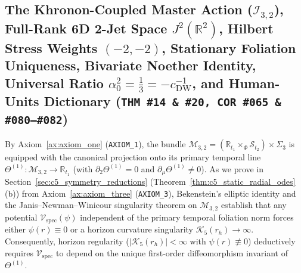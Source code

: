 \documentclass[11pt,a4paper]{article}
\theoremstyle{definition}
\theoremstyle{plain}
\theoremstyle{remark}
\begin{document}
\subsection{The Khronon-Coupled Master Action ($\mathcal{I}_{3,2}$), Full-Rank 6D 2-Jet Space $J^2(\mathbb{R}^2)$, Hilbert Stress Weights $(-2,-2)$, Stationary Foliation Uniqueness, Bivariate Noether Identity, Universal Ratio $\alpha_0^2 = \frac{1}{3} = -c_{\mathrm{DW}}^{-1}$, and Human-Units Dictionary (\texttt{THM~\#14 \& \#20, COR~\#065 \& \#080--\#082})}

By Axiom~\ref{ax:axiom_one} (\texttt{AXIOM\_1}), the bundle $\mathcal{M}_{3,2} = (\mathbb{R}_{t_1} \times_\Phi \mathcal{S}_{t_2}) \times \Sigma_3$ is equipped with the canonical projection onto its primary temporal line $\Theta^{(1)}: \mathcal{M}_{3,2} \to \mathbb{R}_{t_1}$ (with $\partial_2\Theta^{(1)} = 0$ and $\partial_\mu\Theta^{(1)} \neq 0$). As we prove in Section~\ref{sec:c5_symmetry_reductions} (Theorem~\ref{thm:c5_static_radial_odes}(b)) from Axiom~\ref{ax:axiom_three} (\texttt{AXIOM\_3}), Bekenstein's elliptic identity and the Janis--Newman--Winicour singularity theorem on $\mathcal{M}_{3,2}$ establish that any potential $\mathcal{V}_{\mathrm{spec}}(\psi)$ independent of the primary temporal foliation norm forces either $\psi(r) \equiv 0$ or a horizon curvature singularity $\mathcal{K}_5(r_h) \to \infty$. Consequently, horizon regularity ($|\mathcal{K}_5(r_h)| < \infty$ with $\psi(r) \not\equiv 0$) deductively requires $\mathcal{V}_{\mathrm{spec}}$ to depend on the unique first-order diffeomorphism invariant of $\Theta^{(1)}$.
\end{document}
